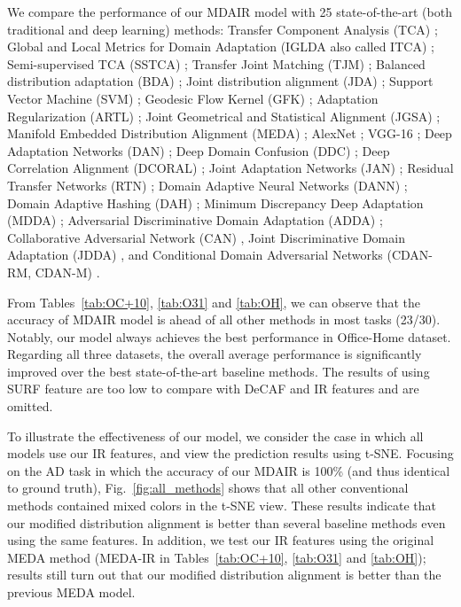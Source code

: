 \documentclass[10pt, conference, compsocconf]{IEEEtran}
\begin{document}
We compare the performance of our MDAIR model with 25 state-of-the-art (both traditional and deep learning) methods:
Transfer Component Analysis  (TCA) \cite{pan2011domain}; 
Global  and  Local  Metrics  for  Domain  Adaptation (IGLDA also called ITCA)  \cite{jiang2017integration};  
Semi-supervised TCA (SSTCA)  \cite{pan2011domain};  
Transfer Joint Matching (TJM) \cite{long2014transfer};  
Balanced distribution adaptation (BDA) \cite{wang2017balanced}; 
Joint distribution alignment (JDA) \cite{long2013transfer}; 
Support Vector Machine (SVM) \cite{bergamo2010exploiting}; 
Geodesic Flow Kernel (GFK) \cite{gong2012geodesic};
Adaptation Regularization (ARTL) \cite{long2014adaptation};
Joint Geometrical and Statistical Alignment (JGSA)
\cite{zhang2017joint}; 
Manifold Embedded Distribution Alignment (MEDA) \cite{wang2018visual}; 
AlexNet \cite{krizhevsky2012imagenet}; 
VGG-16 \cite{simonyan2014very};
Deep Adaptation Networks (DAN) \cite{long2015learning}; 
Deep Domain Confusion (DDC) \cite{tzeng2014deep}; Deep  Correlation Alignment 
(DCORAL) \cite{sun2016deep}; 
Joint Adaptation Networks (JAN) \cite{long2017deep};
Residual Transfer Networks (RTN) \cite{long2016unsupervised};
Domain Adaptive Neural Networks (DANN) \cite{ghifary2014domain};
Domain Adaptive Hashing
(DAH) \cite{venkateswara2017deep};
Minimum Discrepancy Deep Adaptation (MDDA) \cite{rahman2019minimum};
Adversarial Discriminative Domain Adaptation (ADDA) \cite{tzeng2017adversarial};
Collaborative Adversarial Network (CAN) \cite{zhang2018collaborative},  Joint Discriminative  Domain Adaptation (JDDA) \cite{chen2018joint}, and Conditional Domain Adversarial Networks (CDAN-RM, CDAN-M) \cite{long2018conditional}.


 From Tables~\ref{tab:OC+10}, \ref{tab:O31} and \ref{tab:OH}, we can observe that the accuracy of MDAIR model is ahead of all other methods in most tasks (23/30).  Notably, our model always achieves the best performance in Office-Home dataset.  Regarding all three datasets, the overall average performance is significantly improved over the best state-of-the-art baseline methods. The results of using SURF feature are too low to compare with DeCAF and IR features and are omitted.


To illustrate the effectiveness of our model, we consider the case in which all models use our IR features, and view the prediction results using t-SNE. Focusing on the AD task in which the accuracy of our MDAIR is 100\% (and thus identical to ground truth), 
Fig.~\ref{fig:all_methods} shows that all other conventional methods contained  mixed colors in the t-SNE view. These results indicate that our modified distribution alignment is better than several baseline methods even using the same features. In addition, we test our IR features using the original MEDA method (MEDA-IR in Tables~\ref{tab:OC+10}, \ref{tab:O31} and \ref{tab:OH}); results still turn out that our modified distribution alignment is better than the previous MEDA model.
\end{document}
